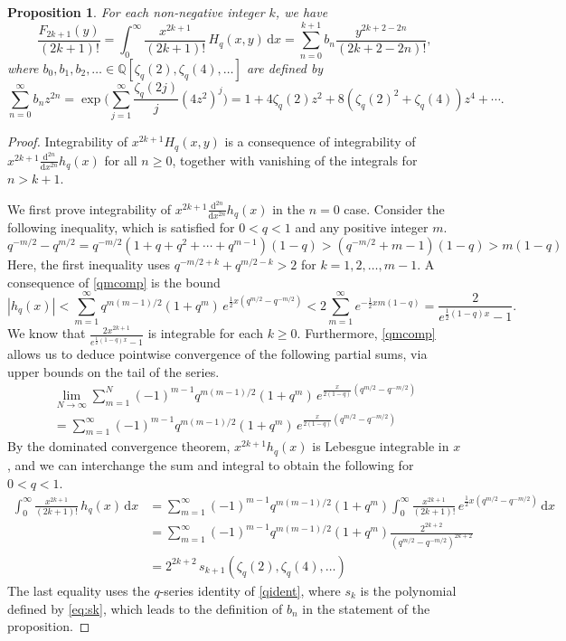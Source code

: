\documentclass[10pt,a4paper]{amsart}
\newtheorem{proposition}{Proposition}
\newcommand{\bq}{\mathbb{Q}}
\newcommand{\dd}{\mathrm{d}}
\renewcommand{\geq}{\geqslant}
\begin{document}
\begin{proposition} \label{F2k+1}
For each non-negative integer $k$, we have
\[
\frac{F_{2k+1}(y)}{(2k+1)!} = \int_0^\infty \!\! \frac{x^{2k+1}}{(2k+1)!} \, H_q(x,y) \, \dd x = \sum_{n=0}^{k+1} b_n \frac{y^{2k+2-2n}}{(2k+2-2n)!},
\]
where $b_0, b_1, b_2, \ldots \in \bq[\zeta_q(2), \zeta_q(4), \ldots]$ are defined by
\[
\sum_{n=0}^\infty b_nz^{2n} = \exp \bigg(\sum_{j=1}^\infty\frac{\zeta_q(2j)}{j} (4z^2)^j \bigg) = 1+4\zeta_q(2)z^2+8(\zeta_q(2)^2+\zeta_q(4))z^4 + \cdots.
\]
\end{proposition}

\begin{proof}
Integrability of $x^{2k+1}H_q(x,y)$ is a consequence of integrability of $x^{2k+1} \frac{\dd^{2n}}{\dd x^{2n}} h_q(x)$ for all $n \geq 0$, together with vanishing of the integrals for $n>k+1$.


We first prove integrability of $x^{2k+1} \frac{\dd^{2n}}{\dd x^{2n}} h_q(x)$ in the $n=0$ case. Consider the following inequality, which is satisfied for $0<q<1$ and any positive integer $m$.
\begin{equation} \label{qmcomp} 
q^{-m/2}-q^{m/2}=q^{-m/2}(1+q+q^2+ \cdots +q^{m-1})(1-q)> (q^{-m/2}+m-1)(1-q)>m(1-q)
\end{equation}
Here, the first inequality uses $q^{-m/2+k}+q^{m/2-k}>2$ for $k=1,2, \ldots, m-1$. A consequence of \cref{qmcomp} is the bound
\[
|h_q(x)| < \sum_{m=1}^\infty q^{m(m-1)/2}(1+q^m) \, e^{\frac{1}{2} x (q^{m/2}-q^{-m/2})} < 2\sum_{m=1}^\infty e^{-\frac{1}{2}xm(1-q)} = \frac{2}{e^{\frac{1}{2}(1-q)x}-1}.
\]
We know that $\frac{2x^{2k+1}}{e^{\frac{1}{2}(1-q)x}-1}$ is integrable for each $k\geq 0$. Furthermore, \cref{qmcomp} allows us to deduce pointwise convergence of the following partial sums, via upper bounds on the tail of the series.
\begin{multline*}
\lim_{N\to\infty} \sum_{m=1}^N (-1)^{m-1}q^{m(m-1)/2}(1+q^m) \, e^{\frac{x}{2(1-q)} (q^{m/2}-q^{-m/2})} \\
= \sum_{m=1}^\infty (-1)^{m-1}q^{m(m-1)/2}(1+q^m) \, e^{\frac{x}{2(1-q)} (q^{m/2}-q^{-m/2})}
\end{multline*}
By the dominated convergence theorem, $x^{2k+1}h_q(x)$ is Lebesgue integrable in $x$, and we can interchange the sum and integral to obtain the following for $0<q<1$.
\begin{align*} 
\int_0^\infty \!\! \frac{x^{2k+1}}{(2k+1)!} \, h_q(x) \, \dd x &= \sum_{m=1}^\infty (-1)^{m-1}q^{m(m-1)/2}(1+q^m) \int_0^\infty \!\! \frac{x^{2k+1}}{(2k+1)!} \, e^{\frac{1}{2}x (q^{m/2}-q^{-m/2})} \, \dd x \\
&=\sum_{m=1}^\infty (-1)^{m-1}q^{m(m-1)/2}(1+q^m)\frac{ 2^{2k+2}}{(q^{m/2}-q^{-m/2})^{2k+2}} \\
&=2^{2k+2} \, s_{k+1}\left(\zeta_q(2), \zeta_q(4), \ldots \right)
\end{align*} 
The last equality uses the $q$-series identity of \cref{qident}, where $s_k$ is the polynomial defined by \cref{eq:sk}, which leads to the definition of $b_n$ in the statement of the proposition.



\end{proof}
\end{document}
